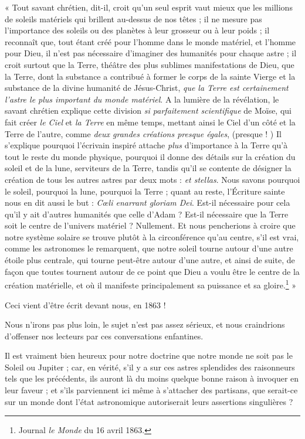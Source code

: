 \documentclass[a4paper, 11pt, oneside]{article}
\begin{document}
« Tout savant chrétien, dit-il, croit qu'un seul esprit vaut mieux que les millions de soleils matériels qui brillent au-dessus de nos têtes ; il ne mesure pas l'importance des soleils ou des planètes à leur grosseur ou à leur poids ; il reconnaît que, tout étant créé pour l'homme dans le monde matériel, et l'homme pour Dieu, il n'est pas nécessaire d'imaginer des humanités pour chaque astre ; il croit surtout que la Terre, théâtre des plus sublimes manifestations de Dieu, que la Terre, dont la substance a contribué à former le corps de la sainte Vierge et la substance de la divine humanité de Jésus-Christ, \emph{que la Terre est certainement l'astre le plus important du monde matériel}. A la lumière de la révélation, le savant chrétien explique cette division \emph{si parfaitement scientifique} de Moïse, qui fait créer \emph{le Ciel} et \emph{la Terre} en même temps, mettant ainsi le Ciel d'un côté et la Terre de l'autre, comme \emph{deux grandes créations presque égales}, (presque ! ) Il s'explique pourquoi l'écrivain inspiré attache \emph{plus} d'importance à la Terre qu'à tout le reste du monde physique, pourquoi il donne des détails sur la création du soleil et de la lune, serviteurs de la Terre, tandis qu'il se contente de désigner la création de tous les autres astres par deux mots : \emph{et stellas}. Nous savons pourquoi le soleil, pourquoi la lune, pourquoi la Terre ; quant au reste, l'Écriture sainte nous en dit aussi le but : \emph{Cœli enarrant gloriam Dei}. Est-il nécessaire pour cela qu'il y ait d'autres humanités que celle d'Adam ? Est-il nécessaire que la Terre soit le centre de l'univers matériel ? Nullement. Et nous pencherions à croire que notre système solaire se trouve plutôt à la circonférence qu'au centre, s'il est vrai, comme les astronomes le remarquent, que notre soleil tourne autour d'une autre étoile plus centrale, qui tourne peut-être autour d'une autre, et ainsi de suite, de façon que toutes tournent autour de ce point que Dieu a voulu être le centre de la création matérielle, et où il manifeste principalement sa puissance et sa gloire.\footnote{Journal \emph{le Monde} du 16 avril 1863.} »

Ceci vient d'être écrit devant nous, en 1863 !

Nous n'irons pas plus loin, le sujet n'est pas assez sérieux, et nous craindrions d'offenser nos lecteurs par ces conversations enfantines.

Il est vraiment bien heureux pour notre doctrine que notre monde ne soit pas le Soleil ou Jupiter ; car, en vérité, s'il y a sur ces astres splendides des raisonneurs tels que les précédents, ils auront là du moins quelque bonne raison à invoquer en leur faveur ; et s'ils parviennent ici même à s'attacher des partisans, que serait-ce sur un monde dont l'état astronomique autoriserait leurs assertions singulières ?
\end{document}
